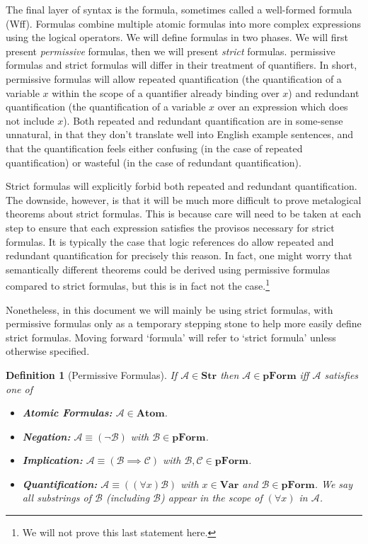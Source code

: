 \documentclass[12pt]{article}
\theoremstyle{break}
\newtheorem{definition}{Definition}[section]
\theoremstyle{break}
\theoremstyle{break}
\theoremstyle{break}
\theoremstyle{break}
\newtheorem{informal definition}[definition]{Informal Definition}
\newcommand{\mc}[1]{\mathcal{#1}}
\begin{document}
The final layer of syntax is the formula, sometimes called a well-formed formula  (Wff).
Formulas combine multiple atomic formulas into more complex expressions using the logical operators.
We will define formulas in two phases.
We will first present \textit{permissive} formulas, then we will present \textit{strict} formulas.
permissive formulas and strict formulas will differ in their treatment of quantifiers.
In short, permissive formulas will allow repeated quantification (the quantification of a variable $x$ within the scope of a quantifier already binding over $x$) and redundant quantification (the quantification of a variable $x$ over an expression which does not include $x$).
Both repeated and redundant quantification are in some-sense unnatural, in that they don't translate well into English example sentences, and that the quantification feels either confusing (in the case of repeated quantification) or wasteful (in the case of redundant quantification).

Strict formulas will explicitly forbid both repeated and redundant quantification.
The downside, however, is that it will be much more difficult to prove metalogical theorems about strict formulas.
This is because care will need to be taken at each step to ensure that each expression satisfies the provisos necessary for strict formulas.
It is typically the case that logic references do allow repeated and redundant quantification for precisely this reason.
In fact, one might worry that semantically different theorems could be derived using permissive formulas compared to strict formulas, but this is in fact not the case.\footnote{We will not prove this last statement here.}

Nonetheless, in this document we will mainly be using strict formulas, with permissive formulas only as a temporary stepping stone to help more easily define strict formulas.
Moving forward `formula' will refer to `strict formula' unless otherwise specified.

\begin{definition}[Permissive Formulas]
If $\mc{A}\in\textbf{Str}$ then $\mc{A}\in\textbf{pForm}$ iff $\mc{A}$ satisfies one of

\begin{itemize}
\item{\textbf{Atomic Formulas:} $\mc{A}\in\textbf{Atom}$.}
\item{\textbf{Negation:} $\mc{A}\equiv (\lnot \mc{B})$ with $\mc{B} \in \textbf{pForm}$.}
\item{\textbf{Implication:} $\mc{A}\equiv (\mc{B}\implies \mc{C})$ with $\mc{B}, \mc{C} \in \textbf{pForm}$.}
\item{\textbf{Quantification:} $\mc{A}\equiv ((\forall x)\mc{B})$ with $x\in \textbf{Var}$ and $\mc{B}\in \textbf{pForm}$. We say all substrings of $\mc{B}$ (including $\mc{B}$) appear in the scope of $(\forall x)$ in $\mc{A}$.}
\end{itemize}
\end{definition}
\end{document}
